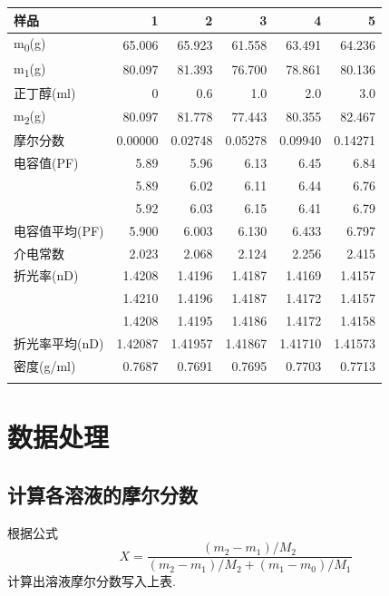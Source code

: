 \documentclass[11pt]{report}
\begin{document}
\begin{center}
\begin{tabular}{lrrrrr}
样品 & 1 & 2 & 3 & 4 & 5\\
\hline
m\textsubscript{0}(g) & 65.006 & 65.923 & 61.558 & 63.491 & 64.236\\
m\textsubscript{1}(g) & 80.097 & 81.393 & 76.700 & 78.861 & 80.136\\
正丁醇(ml) & 0 & 0.6 & 1.0 & 2.0 & 3.0\\
m\textsubscript{2}(g) & 80.097 & 81.778 & 77.443 & 80.355 & 82.467\\
摩尔分数 & 0.00000 & 0.02748 & 0.05278 & 0.09940 & 0.14271\\
电容值(PF) & 5.89 & 5.96 & 6.13 & 6.45 & 6.84\\
 & 5.89 & 6.02 & 6.11 & 6.44 & 6.76\\
 & 5.92 & 6.03 & 6.15 & 6.41 & 6.79\\
电容值平均(PF) & 5.900 & 6.003 & 6.130 & 6.433 & 6.797\\
介电常数 & 2.023 & 2.068 & 2.124 & 2.256 & 2.415\\
折光率(nD) & 1.4208 & 1.4196 & 1.4187 & 1.4169 & 1.4157\\
 & 1.4210 & 1.4196 & 1.4187 & 1.4172 & 1.4157\\
 & 1.4208 & 1.4195 & 1.4186 & 1.4172 & 1.4158\\
折光率平均(nD) & 1.42087 & 1.41957 & 1.41867 & 1.41710 & 1.41573\\
密度(g/ml) & 0.7687 & 0.7691 & 0.7695 & 0.7703 & 0.7713\\
 &  &  &  &  & \\
\end{tabular}
\end{center}




\chapter{数据处理}
\label{sec:orgaf9bd84}
\section{计算各溶液的摩尔分数}
\label{sec:org5b1f205}
根据公式
\[
X=\frac{(m_{2}-m_{1})/M_{2}}{(m_{2}-m_{1})/M_{2}+(m_{1}-m_{0})/M_{1}}
\]
计算出溶液摩尔分数写入上表.
\end{document}
